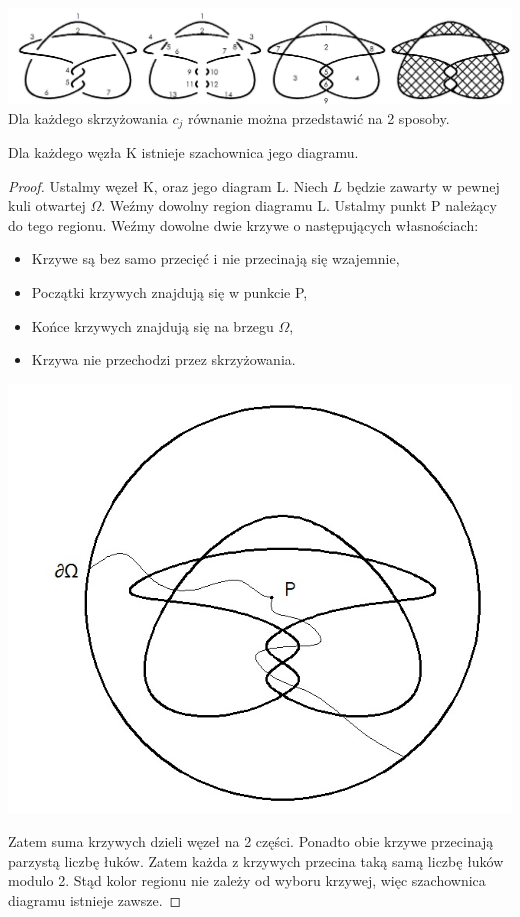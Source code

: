 			\includegraphics[scale=0.3]{2/Obrazy/ArcRegion3} \\


Dla każdego skrzyżowania $c_{j}$ równanie można przedstawić na 2 sposoby. 
\begin{lemat}
Dla każdego węzła K istnieje szachownica jego diagramu.  
\end{lemat}
\begin{proof}
Ustalmy węzeł K, oraz jego diagram L. Niech $L$ będzie zawarty w pewnej kuli otwartej $\Omega$.
Weźmy dowolny region diagramu L. Ustalmy punkt P należący do tego regionu. Weźmy dowolne dwie krzywe o następujących własnościach:




	\begin{minipage}{0.5\textwidth}
\begin{itemize}
\item Krzywe są bez samo przecięć i nie przecinają się wzajemnie,
\item Początki krzywych znajdują się w punkcie P,
\item Końce krzywych znajdują się na brzegu $\Omega$,
\item Krzywa nie przechodzi przez skrzyżowania.	
\end{itemize}
	\end{minipage}
	\begin{minipage}{0.5\textwidth}
		\begin{center}
			\includegraphics[scale=0.3]{2/Obrazy/Chesscircle}
		\end{center}
	\end{minipage}
Zatem suma krzywych dzieli węzeł na 2 części. Ponadto obie krzywe przecinają parzystą liczbę łuków. Zatem każda z krzywych przecina taką samą liczbę łuków modulo 2. Stąd kolor regionu nie zależy od wyboru krzywej, więc szachownica diagramu istnieje zawsze. 

\end{proof}


